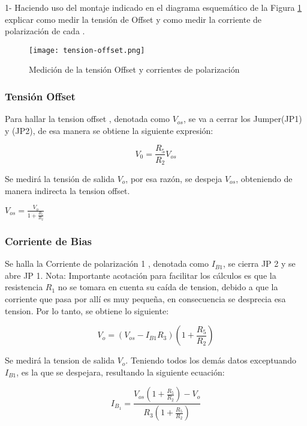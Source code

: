 1- Haciendo uso del montaje indicado en el diagrama esquemático de la Figura \ref{fig:offset-y-bias} explicar como medir la tensión de
Offset y como medir la corriente de polarización de cada
.

\begin{figure}[ht]
    \centering
    \texttt{[image: tension-offset.png]}
    \caption{Medición de la tensión Offset y corrientes de polarización}
    \label{fig:offset-y-bias}
\end{figure}

\subsubsection{Tensión Offset}

Para hallar la tension offset  , denotada como $V_{os}$, se va a cerrar los Jumper(JP1) y
(JP2), de esa manera se obtiene la siguiente expresión: 

\begin{equation}
    V_0=\frac{R_5}{R_2}V_{os}
\end{equation}

Se medirá la tensión de salida  $V_o$, por esa razón, se despeja  $V_{os}$, obteniendo de manera indirecta la tension offset.

$V_{os}=\frac{V_o}{1+\frac{R_5}{R_2}}$

\subsubsection{Corriente de Bias}

 Se halla la Corriente de polarización 1 , denotada como $I_{B1}$, se cierra JP 2 y se abre JP 1. Nota: Importante acotación para facilitar los cálculos es que la resistencia  $R_1$ no se tomara en cuenta su caída de tension, debido a que la corriente que pasa por allí es muy pequeña, en consecuencia se desprecia esa tension. Por lo tanto, se obtiene lo siguiente:

 \begin{equation}
    V_o = (V_{os} - I_{B1}R_3)(1 + \frac{R_5}{R_2})
 \end{equation}

 Se medirá la tension de salida  $V_o$. Teniendo todos los demás datos exceptuando $I_{B1}$, es la que se despejara, resultando la siguiente ecuación:


 \begin{equation}
 \boxed{I_{B_1} = \frac{V_{os} \left( 1 + \frac{R_5}{R_2} \right) - V_o}{R_3 \left( 1 + \frac{R_5}{R_2} \right)}}
 \end{equation}

